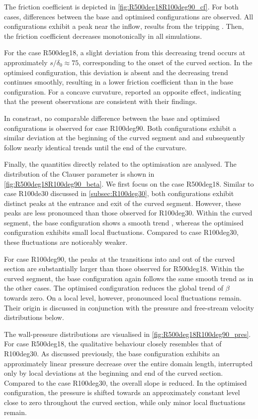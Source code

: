  The friction coefficient is depicted in \autoref{fig:R500deg18R100deg90_cf}.
For both cases, differences between the base and optimised configurations are observed.
All configurations exhibit a peak near the inflow, results from the tripping  .
Then, the 
friction coefficient decreases monotonically in all simulations.

For the case R500deg18,  a slight deviation from this decreasing trend occurs at  approximately $s/\delta_0 \approx 75$, corresponding to the onset of the curved section. In the optimised configuration,  this deviation is absent and the decreasing trend continues smoothly, resulting in a lower friction coefficient than in the base configuration. 
For a concave curvature, \citet{appelbaum_systematic_2025} reported an opposite  effect, indicating that the present observations are consistent with their findings.

In constrast, no comparable difference between the base and optimised configurations is observed for case R100deg90. 
Both configurations exhibit a similar deviation at the beginning of  the curved segment and and subsequently follow nearly identical trends until the end of the curvature.


Finally, the quantities directly related to the optimisation are analysed.
The distribution of the Clauser parameter is shown in \autoref{fig:R500deg18R100deg90_beta}.
We first focus on the case R500deg18.
Similar to case R100de30 discussed in \autoref{subsec:R100deg30}, both configurations  exhibit distinct peaks at the entrance and exit of the curved  segment. However, these peaks are less pronounced than those observed for R100deg30. 
Within the curved segment, the base configuration shows a smooth trend , whereas  the optimised configuration exhibits small local fluctuations.
Compared to case R100deg30, these fluctuations are noticeably weaker.

For case R100deg90, the peaks at the transitions into and out of the curved section are substantially larger than those observed for R500deg18.  
Within the curved segment, the base configuration again follows the same smooth trend as in the other cases.
The optimised configuration reduces the global trend of $\beta$ towards zero. 
On a local level, however, pronounced local fluctuations remain. 
Their origin is discussed in conjunction with the pressure and free-stream velocity distributions below.

The wall-pressure distributions are  visualised in \autoref{fig:R500deg18R100deg90_pres}.
For case R500deg18, the qualitative behaviour closely resembles that of R100deg30. 
As discussed previously, the base configuration  exhibits an approximately linear pressure decrease over the entire domain length,  interrupted only by local deviations at the beginning and end of the curved section. 
Compared to the case R100deg30,  the overall slope is reduced.
 In the optimised configuration, the pressure is shifted towards an approximately constant level close to zero throughout the curved section, while only minor local fluctuations remain. 

